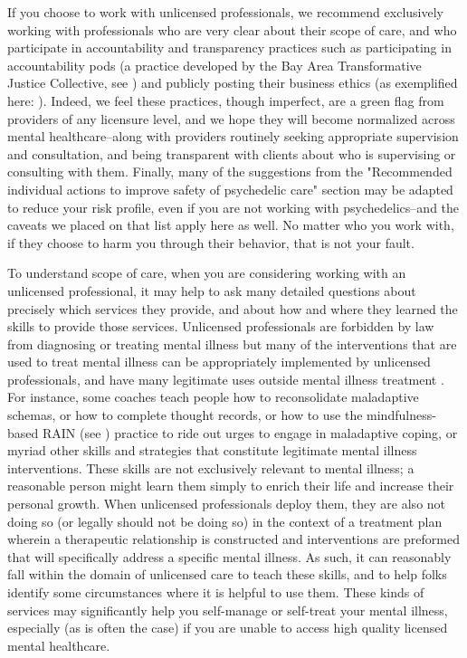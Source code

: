 \documentclass[12pt,letterpaper]{book}
\begin{document}
If you choose to work with unlicensed professionals, we recommend exclusively working with professionals who are very clear about their scope of care, and who participate in accountability and transparency practices such as participating in accountability pods (a practice developed by the Bay Area Transformative Justice Collective, see \textcite{podmapping}) and publicly posting their business ethics (as exemplified here: \textcite{sinbackValues}). Indeed, we feel these practices, though imperfect, are a green flag from providers of any licensure level, and we hope they will become normalized across mental healthcare–along with providers routinely seeking appropriate supervision and consultation, and being transparent with clients about who is supervising or consulting with them. Finally, many of the suggestions from the "Recommended individual actions to improve safety of psychedelic care" section may be adapted to reduce your risk profile, even if you are not working with psychedelics–and the caveats we placed on that list apply here as well. No matter who you work with, if they choose to harm you through their behavior, that is not your fault.

To understand scope of care, when you are considering working with an unlicensed professional, it may help to ask many detailed questions about precisely which services they provide, and about how and where they learned the skills to provide those services. Unlicensed professionals are forbidden by law from diagnosing or treating mental illness but many of the interventions that are used to treat mental illness can be appropriately implemented by unlicensed professionals, and have many legitimate uses outside mental illness treatment \cite{aboujaoude2020coachingVSTherapy,healthyGamerCoaching}. For instance, some coaches teach people how to reconsolidate maladaptive schemas, or how to complete thought records, or how to use the mindfulness-based RAIN (see \textcite{rain}) practice to ride out urges to engage in maladaptive coping, or myriad other skills and strategies that constitute legitimate mental illness interventions. These skills are not exclusively relevant to mental illness; a reasonable person might learn them simply to enrich their life and increase their personal growth. When unlicensed professionals deploy them, they are also not doing so (or legally should not be doing so) in the context of a treatment plan wherein a therapeutic relationship is constructed and interventions are preformed that will specifically address a specific mental illness. As such, it can reasonably fall within the domain of unlicensed care to teach these skills, and to help folks identify some circumstances where it is helpful to use them. These kinds of services may significantly help you self-manage or self-treat your mental illness, especially (as is often the case) if you are unable to access high quality licensed mental healthcare.
\end{document}
